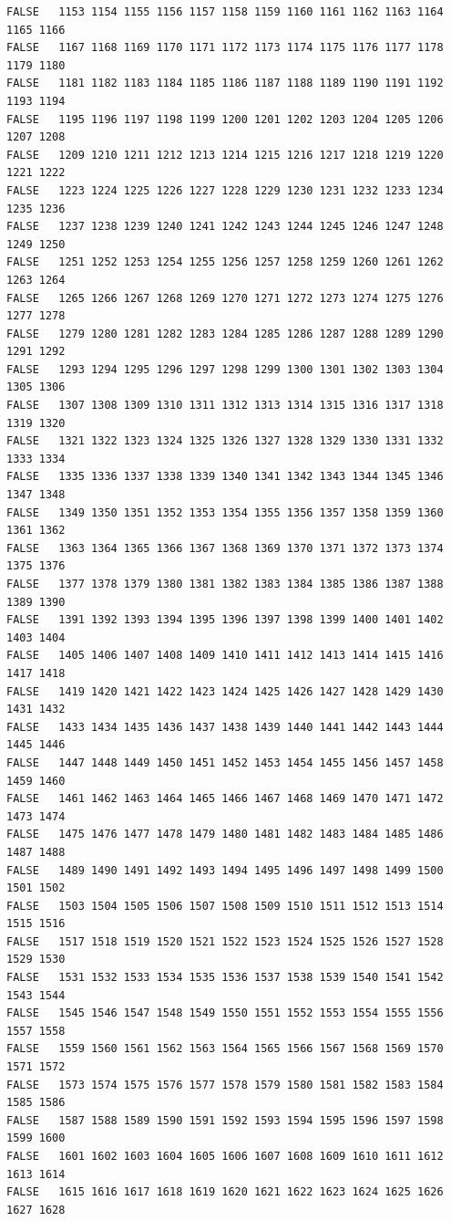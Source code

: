\documentclass[]{article}
\begin{document}
\begin{verbatim}
FALSE   1153 1154 1155 1156 1157 1158 1159 1160 1161 1162 1163 1164 1165 1166
FALSE   1167 1168 1169 1170 1171 1172 1173 1174 1175 1176 1177 1178 1179 1180
FALSE   1181 1182 1183 1184 1185 1186 1187 1188 1189 1190 1191 1192 1193 1194
FALSE   1195 1196 1197 1198 1199 1200 1201 1202 1203 1204 1205 1206 1207 1208
FALSE   1209 1210 1211 1212 1213 1214 1215 1216 1217 1218 1219 1220 1221 1222
FALSE   1223 1224 1225 1226 1227 1228 1229 1230 1231 1232 1233 1234 1235 1236
FALSE   1237 1238 1239 1240 1241 1242 1243 1244 1245 1246 1247 1248 1249 1250
FALSE   1251 1252 1253 1254 1255 1256 1257 1258 1259 1260 1261 1262 1263 1264
FALSE   1265 1266 1267 1268 1269 1270 1271 1272 1273 1274 1275 1276 1277 1278
FALSE   1279 1280 1281 1282 1283 1284 1285 1286 1287 1288 1289 1290 1291 1292
FALSE   1293 1294 1295 1296 1297 1298 1299 1300 1301 1302 1303 1304 1305 1306
FALSE   1307 1308 1309 1310 1311 1312 1313 1314 1315 1316 1317 1318 1319 1320
FALSE   1321 1322 1323 1324 1325 1326 1327 1328 1329 1330 1331 1332 1333 1334
FALSE   1335 1336 1337 1338 1339 1340 1341 1342 1343 1344 1345 1346 1347 1348
FALSE   1349 1350 1351 1352 1353 1354 1355 1356 1357 1358 1359 1360 1361 1362
FALSE   1363 1364 1365 1366 1367 1368 1369 1370 1371 1372 1373 1374 1375 1376
FALSE   1377 1378 1379 1380 1381 1382 1383 1384 1385 1386 1387 1388 1389 1390
FALSE   1391 1392 1393 1394 1395 1396 1397 1398 1399 1400 1401 1402 1403 1404
FALSE   1405 1406 1407 1408 1409 1410 1411 1412 1413 1414 1415 1416 1417 1418
FALSE   1419 1420 1421 1422 1423 1424 1425 1426 1427 1428 1429 1430 1431 1432
FALSE   1433 1434 1435 1436 1437 1438 1439 1440 1441 1442 1443 1444 1445 1446
FALSE   1447 1448 1449 1450 1451 1452 1453 1454 1455 1456 1457 1458 1459 1460
FALSE   1461 1462 1463 1464 1465 1466 1467 1468 1469 1470 1471 1472 1473 1474
FALSE   1475 1476 1477 1478 1479 1480 1481 1482 1483 1484 1485 1486 1487 1488
FALSE   1489 1490 1491 1492 1493 1494 1495 1496 1497 1498 1499 1500 1501 1502
FALSE   1503 1504 1505 1506 1507 1508 1509 1510 1511 1512 1513 1514 1515 1516
FALSE   1517 1518 1519 1520 1521 1522 1523 1524 1525 1526 1527 1528 1529 1530
FALSE   1531 1532 1533 1534 1535 1536 1537 1538 1539 1540 1541 1542 1543 1544
FALSE   1545 1546 1547 1548 1549 1550 1551 1552 1553 1554 1555 1556 1557 1558
FALSE   1559 1560 1561 1562 1563 1564 1565 1566 1567 1568 1569 1570 1571 1572
FALSE   1573 1574 1575 1576 1577 1578 1579 1580 1581 1582 1583 1584 1585 1586
FALSE   1587 1588 1589 1590 1591 1592 1593 1594 1595 1596 1597 1598 1599 1600
FALSE   1601 1602 1603 1604 1605 1606 1607 1608 1609 1610 1611 1612 1613 1614
FALSE   1615 1616 1617 1618 1619 1620 1621 1622 1623 1624 1625 1626 1627 1628

\end{verbatim}
\end{document}
